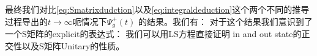 最终我们对比\cref{eq:Smatrixdudction}以及\cref{eq:integraldeduction}这个两个不同的推导过程导出的$ t \to \infty $呃情况下$ \Psi_g^+(t) $  的结果。我们有：
对于这个结果我们意识到了一个S矩阵的explicit的表达式：
\line
我们可以用LS方程直接证明 in and out state的正交性以及S矩阵Unitary的性质。